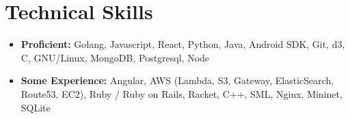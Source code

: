 \documentclass[letterpaper,11pt]{article}
\newcommand{\resumeSubHeadingListStart}{\begin{itemize}[leftmargin=*]}
\newcommand{\resumeSubHeadingListEnd}{\end{itemize}}
\begin{document}
\section{Technical Skills}
  \resumeSubHeadingListStart
    \item{
            \textbf{Proficient:} {Golang, Javascript, React, Python, Java, Android SDK, Git, d3, C, GNU/Linux, MongoDB, Postgresql, Node}
    }
    \item {
            \textbf{Some Experience:} {Angular, AWS (Lambda, S3, Gateway, ElasticSearch, Route53, EC2), Ruby / Ruby on Rails, Racket, C++, SML, Nginx, Mininet, SQLite}
    }
 \resumeSubHeadingListEnd


\end{document}
